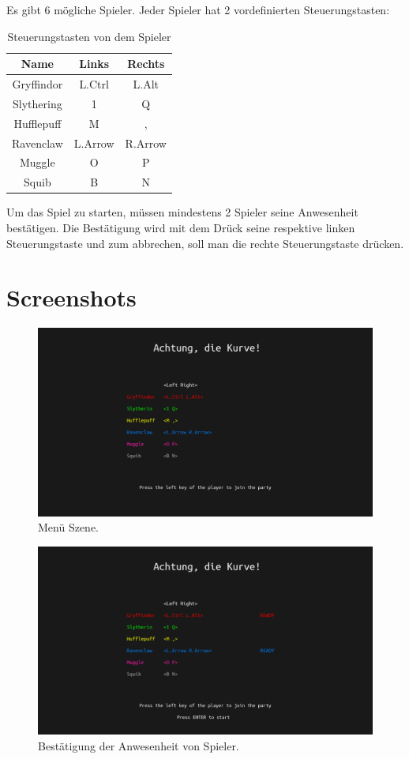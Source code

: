 \documentclass[doktyp=studarbeit]{TUBAFarbeiten}
\begin{document}
Es gibt 6 mögliche Spieler. Jeder Spieler hat 2 vordefinierten Steuerungstasten:

\begin{table}
    \centering
    \begin{tabular}{ |c|c|c| }
        \hline
        Name & Links & Rechts \\
        \hline
        Gryffindor & L.Ctrl  & L.Alt \\
        Slythering & 1       & Q \\
        Hufflepuff & M       & , \\
        Ravenclaw  & L.Arrow & R.Arrow \\
        Muggle     & O       & P \\
        Squib      & B       & N \\
        \hline
    \end{tabular}
    \caption{Steuerungstasten von dem Spieler}
\end{table}

\FloatBarrier
Um das Spiel zu starten, müssen mindestens 2 Spieler seine Anwesenheit 
bestätigen. Die Bestätigung wird mit dem Drück seine respektive linken
Steuerungstaste und zum abbrechen, soll man die rechte Steuerungstaste drücken.

\newpage
\appendix
\section{Screenshots}
\begin{figure}[!htb]
	\centering
	\includegraphics[width=0.9\linewidth]{1.png}
	\caption{Menü Szene.}
	\label{fig:menu}
\end{figure}

\begin{figure}[!htb]
	\centering
	\includegraphics[width=0.9\linewidth]{2.png}
	\caption{Bestätigung der Anwesenheit von Spieler.}
	\label{fig:confirmation}
\end{figure}
\end{document}
